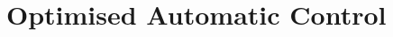 \documentclass[MTRX3700report.tex]{subfiles}
\begin{document}
\section{Optimised Automatic Control}
%
%
\end{document}
